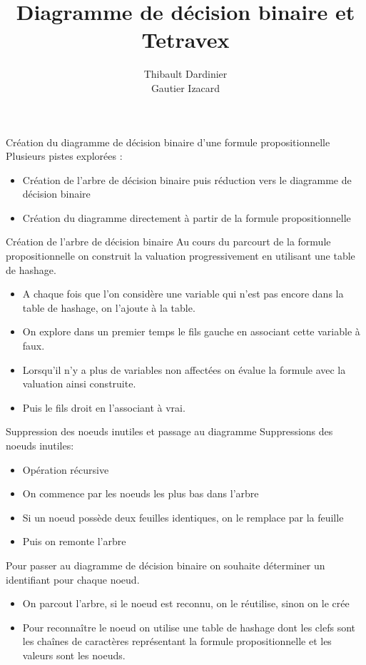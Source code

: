 \documentclass{beamer}
\title{Diagramme de décision binaire et Tetravex}
\author{Thibault Dardinier \\ Gautier Izacard}
\begin{document}
\maketitle


\begin{frame}{Création du diagramme de décision binaire d'une formule propositionnelle}
Plusieurs pistes explorées :
\begin{itemize}
\item Création de l'arbre de décision binaire puis réduction vers le diagramme de décision binaire
\item Création du diagramme directement à partir de la formule propositionnelle
\end{itemize}
\end{frame}

\begin{frame}{Création de l'arbre de décision binaire}
Au cours du parcourt de la formule propositionnelle on construit la valuation progressivement en utilisant une table de hashage. 
\begin{itemize}
\item A chaque fois que l'on considère une variable qui n'est pas encore dans la table de hashage, on l'ajoute à la table.
\item On explore dans un premier temps le fils gauche en associant cette variable à faux.
\item Lorsqu'il n'y a plus de variables non affectées on évalue la formule avec la valuation ainsi construite.
\item Puis le fils droit en l'associant à vrai.
\end{itemize}
\end{frame}

\begin{frame}{Suppression des noeuds inutiles et passage au diagramme}
Suppressions des noeuds inutiles:
\begin{itemize}
\item Opération récursive
\item On commence par les noeuds les plus bas dans l'arbre
\item Si un noeud possède deux feuilles identiques, on le remplace par la feuille
\item Puis on remonte l'arbre
\end{itemize}
Pour passer au diagramme de décision binaire on souhaite déterminer un identifiant pour chaque noeud.
\begin{itemize}
\item On parcout l'arbre, si le noeud est reconnu, on le réutilise, sinon on le crée
\item Pour reconnaître le noeud on utilise une table de hashage dont les clefs sont les chaînes de caractères représentant la formule propositionnelle et les valeurs sont les noeuds.
\end{itemize}
\end{frame}
\end{document}
